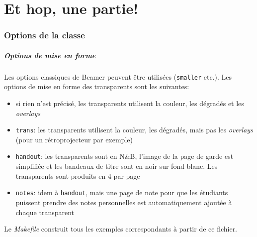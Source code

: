 \documentclass[fr,biblatex,outline]{isae-slides}
\begin{document}
\part<presentation>[Partie pour voir]{Et hop, une partie!}

\section{Options de la classe}
\label{sec:class}

\begin{frame}
\frametitle{Options de mise en forme}

\vfill

Les options classiques de Beamer peuvent être utilisées
(\texttt{smaller} etc.). Les options de mise en forme des transparents
sont les suivantes:

\begin{itemize}
\item si rien n'est précisé, les transparents
  utilisent la couleur, les dégradés et les \textit{overlays}
\item \lstinline!trans!: les transparents utilisent la couleur, les
  dégradés, mais pas les \textit{overlays} (pour un rétroprojecteur
  par exemple)
\item \lstinline!handout!: les transparents sont en N\&B, l'image de
  la page de garde est simplifiée et les bandeaux de titre sont en
  noir sur fond blanc. Les transparents sont produits en 4 par page
\item \lstinline!notes!: idem à \lstinline!handout!, mais une page de
  note pour que les étudiants puissent prendre des notes personnelles
  est automatiquement ajoutée à chaque transparent
\end{itemize}

Le \textit{Makefile} construit tous les exemples correspondants à
partir de ce fichier.

\vfill

\end{frame}
\end{document}
